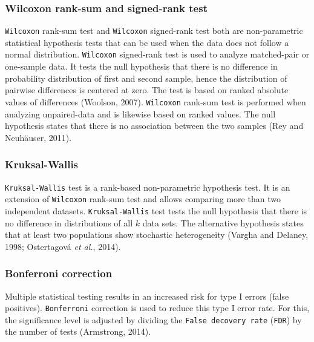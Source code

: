 \documentclass[
  parskip,
  oneside]{\documentclass[oneside]{book}}
\begin{document}
\hypertarget{wilcoxon-rank-sum-and-signed-rank-test}{%
\subsubsection{Wilcoxon rank-sum and signed-rank
test}\label{wilcoxon-rank-sum-and-signed-rank-test}}

\texttt{Wilcoxon} rank-sum test and \texttt{Wilcoxon} signed-rank test
both are non-parametric statistical hypothesis tests that can be used
when the data does not follow a normal distribution. \texttt{Wilcoxon}
signed-rank test is used to analyze matched-pair or one-sample data. It
tests the null hypothesis that there is no difference in probability
distribution of first and second sample, hence the distribution of
pairwise differences is centered at zero. The test is based on ranked
absolute values of differences (Woolson, 2007). \texttt{Wilcoxon}
rank-sum test is performed when analyzing unpaired-data and is likewise
based on ranked values. The null hypothesis states that there is no
association between the two samples (Rey and Neuhäuser, 2011).

\hypertarget{kruksal-wallis}{%
\subsubsection{Kruksal-Wallis}\label{kruksal-wallis}}

\texttt{Kruksal-Wallis} test is a rank-based non-parametric hypothesis
test. It is an extension of \texttt{Wilcoxon} rank-sum test and allows
comparing more than two independent datasets. \texttt{Kruksal-Wallis}
test tests the null hypothesis that there is no difference in
distributions of all \(k\) data sets. The alternative hypothesis states
that at least two populations show stochastic heterogeneity (Vargha and
Delaney, 1998; Ostertagová \emph{et al.}, 2014).

\hypertarget{bonferroni-correction}{%
\subsubsection{Bonferroni correction}\label{bonferroni-correction}}

Multiple statistical testing results in an increased risk for type I
errors (false positives). \texttt{Bonferroni} correction is used to
reduce this type I error rate. For this, the significance level is
adjusted by dividing the \texttt{False\ decovery\ rate} (\texttt{FDR})
by the number of tests (Armstrong, 2014).
\end{document}
